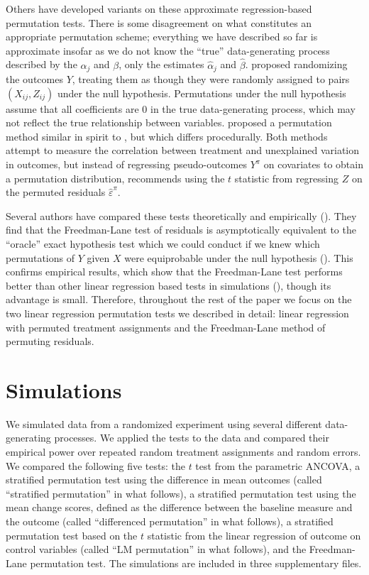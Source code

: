 \documentclass[12pt]{article}
\newcommand{\todo}[1]{{\color{red}{TO DO: \sc #1}}}
\begin{document}
Others have developed variants on these approximate regression-based permutation tests. 
There is some disagreement on what constitutes an appropriate permutation scheme;
everything we have described so far is approximate insofar as we do not know the ``true'' data-generating process described by the $\alpha_j$ and $\beta$,
only the estimates $\hat{\alpha}_j$ and $\hat{\beta}$.
\cite{manly_randomization_2006} proposed randomizing the outcomes $Y$, treating them as though they were randomly assigned to pairs $(X_{ij}, Z_{ij})$ under the null hypothesis.
\todo{is this clear?}
Permutations under the null hypothesis assume that all coefficients are 0 in the true data-generating process, which may not reflect the true relationship between variables.
\cite{kennedy_randomization_1995} proposed a permutation method similar in spirit to \cite{freedman_nonstochastic_1983}, but which differs procedurally.
Both methods attempt to measure the correlation between treatment and unexplained variation in outcomes, but
instead of regressing pseudo-outcomes $Y^\pi$ on covariates to obtain a permutation distribution, \cite{kennedy_randomization_1995} recommends using the $t$ statistic from regressing $Z$ on the permuted residuals $\hat{\varepsilon}^\pi$. 

Several authors have compared these tests theoretically and empirically (\cite{anderson_empirical_1999, anderson_permutation_2001, kennedy_randomization_1996}).
They find that the Freedman-Lane test of residuals is asymptotically equivalent to the ``oracle'' exact hypothesis test which we could conduct if we knew which permutations of $Y$ given $X$ were equiprobable under the null hypothesis (\cite{anderson_permutation_2001}).
This confirms empirical results, which show that the Freedman-Lane test performs better than other linear regression based tests in simulations (\cite{anderson_empirical_1999}), though its advantage is small.
Therefore, throughout the rest of the paper we focus on the two linear regression permutation tests we described in detail: linear regression with permuted treatment assignments and the Freedman-Lane method of permuting residuals.


\section{Simulations}\label{sec:simulations}

We simulated data from a randomized experiment using several different data-generating processes.
We applied the tests to the data and compared their empirical power over repeated random treatment assignments and random errors.
We compared the following five tests:
the $t$ test from the parametric ANCOVA,
a stratified permutation test using the difference in mean outcomes
 (called ``stratified permutation'' in what follows),
a stratified permutation test using the mean change scores, defined as the difference between the baseline measure and the outcome (called ``differenced permutation'' in what follows),
a stratified permutation test based on the $t$ statistic from the linear regression of outcome on control variables (called ``LM permutation'' in what follows),
and the Freedman-Lane permutation test.
The simulations are included in three supplementary files.
\end{document}
